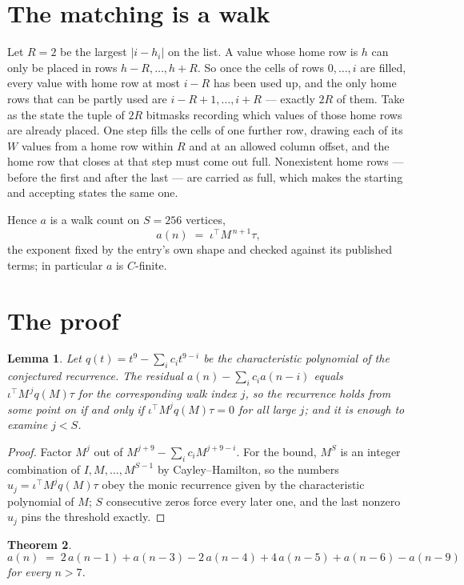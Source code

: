 \documentclass[11pt,a4paper]{article}
\theoremstyle{plain}
\newtheorem{theorem}{Theorem}
\newtheorem{lemma}[theorem]{Lemma}
\theoremstyle{definition}
\begin{document}
\section{The matching is a walk}

Let $R=2$ be the largest $|i-h_i|$ on the list. A value whose home row is $h$ can only be
placed in rows $h-R,\dots,h+R$. So once the cells of rows $0,\dots,i$ are filled, every
value with home row at most $i-R$ has been used up, and the only home rows that can be
partly used are $i-R+1,\dots,i+R$ --- exactly $2R$ of them. Take as the state the tuple of
$2R$ bitmasks recording which values of those home rows are already placed. One step fills
the cells of one further row, drawing each of its $W$ values from a home row within $R$
and at an allowed column offset, and the home row that closes at that step must come out
full. Nonexistent home rows --- before the first and after the last --- are carried as
full, which makes the starting and accepting states the same one.

Hence $a$ is a walk count on $S=256$ vertices,
\[
a(n)\;=\;\iota^{\!\top}M^{\,n+1}\tau ,
\]
the exponent fixed by the entry's own shape and checked against its published terms; in
particular $a$ is $C$-finite.

\section{The proof}

\begin{lemma}\label{lem:crit}
Let $q(t)=t^{9}-\sum_i c_it^{9-i}$ be the characteristic polynomial of the
conjectured recurrence. The residual $a(n)-\sum_ic_ia(n-i)$ equals
$\iota^{\!\top}M^{\,j}q(M)\tau$ for the corresponding walk index $j$, so the recurrence
holds from some point on if and only if $\iota^{\!\top}M^{j}q(M)\tau=0$ for all large $j$;
and it is enough to examine $j<S$.
\end{lemma}

\begin{proof}
Factor $M^{j}$ out of $M^{j+9}-\sum_ic_iM^{j+9-i}$. For the bound, $M^{S}$
is an integer combination of $I,M,\dots,M^{S-1}$ by Cayley--Hamilton, so the numbers
$u_j=\iota^{\!\top}M^{j}q(M)\tau$ obey the monic recurrence given by the characteristic
polynomial of $M$; $S$ consecutive zeros force every later one, and the last nonzero $u_j$
pins the threshold exactly.
\end{proof}

\begin{theorem}
\[
a(n)\;=\;2\,a(n-1) + a(n-3) - 2\,a(n-4) + 4\,a(n-5) + a(n-6) - a(n-9)
\]
for every $n>7$.
\end{theorem}
\end{document}
